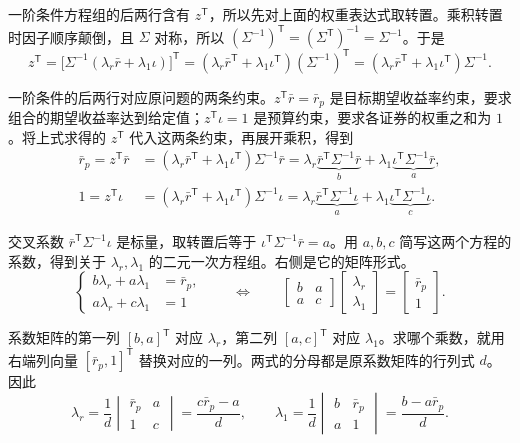\begin{solution}[label-content={证明},blank-type=none]
一阶条件方程组的后两行含有 $z^{\mathsf T}$，所以先对上面的权重表达式取转置。乘积转置时因子顺序颠倒，且 $\Sigma$ 对称，所以 $(\Sigma^{-1})^{\mathsf T}=(\Sigma^{\mathsf T})^{-1}=\Sigma^{-1}$。于是
\[
 z^{\mathsf T}
 =\bigl[\Sigma^{-1}(\lambda_r\bar r+\lambda_1\iota)\bigr]^{\mathsf T}
 =(\lambda_r\bar r^{\mathsf T}+\lambda_1\iota^{\mathsf T})(\Sigma^{-1})^{\mathsf T}
 =(\lambda_r\bar r^{\mathsf T}+\lambda_1\iota^{\mathsf T})\Sigma^{-1}.
\]

一阶条件的后两行对应原问题的两条约束。$z^{\mathsf T}\bar r=\bar r_p$ 是目标期望收益率约束，要求组合的期望收益率达到给定值；$z^{\mathsf T}\iota=1$ 是预算约束，要求各证券的权重之和为 $1$。将上式求得的 $z^{\mathsf T}$ 代入这两条约束，再展开乘积，得到
\[
 \begin{aligned}
 \bar r_p=z^{\mathsf T}\bar r
 &=(\lambda_r\bar r^{\mathsf T}+\lambda_1\iota^{\mathsf T})\Sigma^{-1}\bar r
   =\lambda_r\underbrace{\bar r^{\mathsf T}\Sigma^{-1}\bar r}_{b}
   +\lambda_1\underbrace{\iota^{\mathsf T}\Sigma^{-1}\bar r}_{a},\\
 1=z^{\mathsf T}\iota
 &=(\lambda_r\bar r^{\mathsf T}+\lambda_1\iota^{\mathsf T})\Sigma^{-1}\iota
   =\lambda_r\underbrace{\bar r^{\mathsf T}\Sigma^{-1}\iota}_{a}
   +\lambda_1\underbrace{\iota^{\mathsf T}\Sigma^{-1}\iota}_{c}.
 \end{aligned}
\]

交叉系数 $\bar r^{\mathsf T}\Sigma^{-1}\iota$ 是标量，取转置后等于 $\iota^{\mathsf T}\Sigma^{-1}\bar r=a$。用 $a,b,c$ 简写这两个方程的系数，得到关于 $\lambda_r,\lambda_1$ 的二元一次方程组。右侧是它的矩阵形式。
\[
 \left\{
 \begin{aligned}
 b\lambda_r+a\lambda_1&=\bar r_p,\\
 a\lambda_r+c\lambda_1&=1
 \end{aligned}
 \right.
 \qquad\Longleftrightarrow\qquad
 \begin{bmatrix}b&a\\a&c\end{bmatrix}
 \begin{bmatrix}\lambda_r\\\lambda_1\end{bmatrix}
 =\begin{bmatrix}\bar r_p\\1\end{bmatrix}.
\]

系数矩阵的第一列 $[b,a]^{\mathsf T}$ 对应 $\lambda_r$，第二列 $[a,c]^{\mathsf T}$ 对应 $\lambda_1$。求哪个乘数，就用右端列向量 $[\bar r_p,1]^{\mathsf T}$ 替换对应的一列。两式的分母都是原系数矩阵的行列式 $d$。因此
\[
 \lambda_r=\frac{1}{d}
 \begin{vmatrix}\bar r_p&a\\1&c\end{vmatrix}
 =\frac{c\bar r_p-a}{d},\qquad
 \lambda_1=\frac{1}{d}
 \begin{vmatrix}b&\bar r_p\\a&1\end{vmatrix}
 =\frac{b-a\bar r_p}{d}.
\]


\end{solution}
